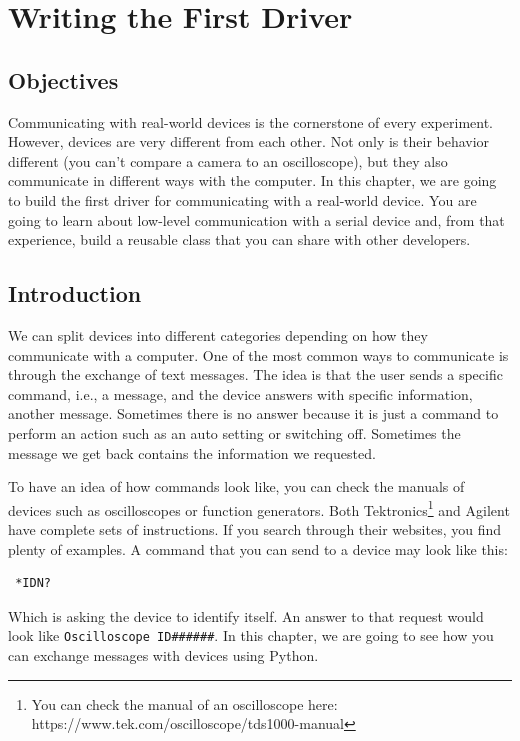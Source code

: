 \chapter{Writing the First Driver}\label{ch:first-driver}

\section{Objectives}\label{sec:driver-objectives}
Communicating with real-world devices is the cornerstone of every experiment. However, devices are very different from each other. Not only is their behavior different (you can't compare a camera to an oscilloscope), but they also communicate in different ways with the computer. In this chapter,
we are going to build the first driver for communicating with a real-world device. You are going to learn about low-level communication with a serial device and, from that experience, build a reusable class that you can share with other developers.

\section{Introduction}\label{sec:driver-introduction}
We can split devices into different categories depending on how they communicate with a computer. One of the most common ways to communicate is through the exchange of text messages. The idea is that the user sends a specific command, i.e., a message, and the device answers with specific information, another message. Sometimes there is no answer because it is just a command to perform an action such as an auto setting or switching off. Sometimes the message we get back contains the information we requested.

To have an idea of how commands look like, you can check the manuals of devices such as oscilloscopes or function generators. Both Tektronics\footnote{You can check the manual of an oscilloscope here: https://www.tek.com/oscilloscope/tds1000-manual} and Agilent have complete sets of instructions. If you search through their websites, you find plenty of examples. A command that you can send to a device may look like this:

\begin{verbatim}
 *IDN?
\end{verbatim}

Which is asking the device to identify itself. An answer to that request would look like \texttt{Oscilloscope ID\#\#\#\#\#\#}. In this chapter, we are going to see how you can exchange messages with devices using Python.

